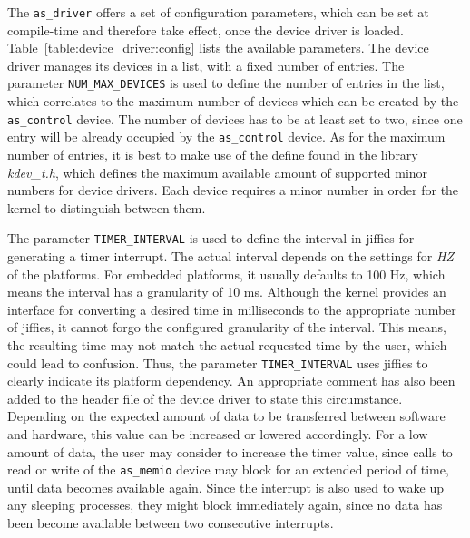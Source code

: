 The \texttt{as\_driver} offers a set of configuration parameters, which can be set at compile-time and therefore take effect, once the device driver is loaded.
Table~\ref{table:device_driver:config} lists the available parameters.
The device driver manages its devices in a list, with a fixed number of entries.
The parameter \texttt{NUM\_MAX\_DEVICES} is used to define the number of entries in the list, which correlates to the maximum number of devices which can be created by the \texttt{as\_control} device.
The number of devices has to be at least set to two, since one entry will be already occupied by the \texttt{as\_control} device.
As for the maximum number of entries, it is best to make use of the define found in the library \textit{kdev\_t.h}, which defines the maximum available amount of supported minor numbers for device drivers.
Each device requires a minor number in order for the kernel to distinguish between them.

The parameter \texttt{TIMER\_INTERVAL} is used to define the interval in jiffies for generating a timer interrupt.
The actual interval depends on the settings for \textit{HZ} of the platforms. 
For embedded platforms, it usually defaults to 100 Hz, which means the interval has a granularity of 10 ms.
Although the kernel provides an interface for converting a desired time in milliseconds to the appropriate number of jiffies, it cannot forgo the configured granularity of the interval.
This means, the resulting time may not match the actual requested time by the user, which could lead to confusion.
Thus, the parameter \texttt{TIMER\_INTERVAL} uses jiffies to clearly indicate its platform dependency.
An appropriate comment has also been added to the header file of the device driver to state this circumstance.
Depending on the expected amount of data to be transferred between software and hardware, this value can be increased or lowered accordingly.
For a low amount of data, the user may consider to increase the timer value, since calls to read or write of the \texttt{as\_memio} device may block for an extended period of time, until data becomes available again.
Since the interrupt is also used to wake up any sleeping processes, they might block immediately again, since no data has been become available between two consecutive interrupts.

